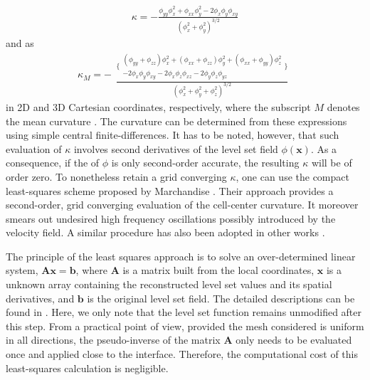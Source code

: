 \begin{equation}
  \begin{aligned}
    \kappa =- \frac{\phi_{yy}\phi_x^2 + \phi_{xx}\phi_y^2 - 2\phi_x\phi_y\phi_{xy}}{{(\phi_x^2+\phi_y^2) }^{3/2}}
  \end{aligned}
  \label{curv 2d}
\end{equation}
and as
\begin{equation}
  \kappa_M = -
  \begin{aligned}
    \frac{\bigg\{ 
          \begin{aligned}
          (\phi_{yy}+\phi_{zz})\phi_x^2 + (\phi_{xx}+\phi_{zz})\phi_y^2  + (\phi_{xx}+\phi_{yy})\phi_z^2 \\
          - 2\phi_x\phi_y\phi_{xy} - 2\phi_x\phi_z\phi_{xz} - 2\phi_y\phi_z\phi_{yz}
          \end{aligned}
          \bigg\}
          } {{(\phi_x^2+\phi_y^2+\phi_z^2) }^{3/2}}
  \end{aligned}
  \label{curv 3d}
\end{equation}
in 2D and 3D Cartesian coordinates, respectively, where the subscript $M$ denotes the mean curvature \cite{Sethian_levelset}. The curvature can be determined from these expressions using simple central finite-differences. It has to be noted, however, that such evaluation of $\kappa$ involves second derivatives of the level set field $\phi({\bm x})$. As a consequence, if the  of $\phi$ is only second-order accurate, the resulting $\kappa$ will be of order zero. To nonetheless retain a grid converging $\kappa$, one can use the compact least-squares scheme proposed by Marchandise \etal \cite{Marchandise_JCP_2007}. Their approach provides a second-order, grid converging evaluation of the cell-center curvature. It moreover smears out undesired high frequency oscillations possibly introduced by the velocity field. A similar procedure has also been adopted in other works \cite{Desjardins_JCP_2008, Luo_JCP_2015}.

The principle of the least squares approach is to solve an over-determined linear system, $\bm {A x} = {\bm b}$, where ${\bm A}$ is a matrix built from the local coordinates, ${\bm x}$ is a unknown array containing the reconstructed level set values and its spatial derivatives, and ${\bm b}$ is the original level set field. The detailed descriptions can be found in \cite{Marchandise_JCP_2007}. Here, we only note that the level set function remains unmodified after this step. From a practical point of view, provided the mesh considered is uniform in all directions, the pseudo-inverse of the matrix ${\bm A}$ only needs to be evaluated once and applied close to the interface. Therefore, the computational cost of this least-squares calculation is negligible.

